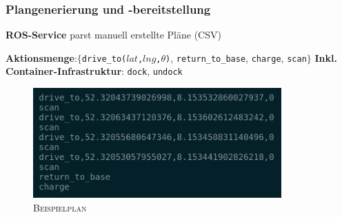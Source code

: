 \documentclass{beamer}
\newcommand{\code}[1]{\colorbox{light-gray}{\texttt{#1}}}
\begin{document}
\begin{frame}
  \frametitle{Plangenerierung und -bereitstellung}
  \textbf{ROS-Service} parst manuell erstellte Pläne (CSV)\newline
  
  \textbf{Aktionsmenge}:\newline $\{$\code{drive\_to($lat$,$lng$,$\theta$)}, \code{return\_to\_base}, \code{charge}, \code{scan}$\}$\newline
  \textbf{Inkl. Container-Infrastruktur}: \code{dock}, \code{undock}
  \begin{figure}[H]
    \centering
    \includegraphics[width=0.85\textwidth]{img/plan_example.png}
    \caption*{\textsc{Beispielplan}}
  \end{figure}
\end{frame}
\end{document}

